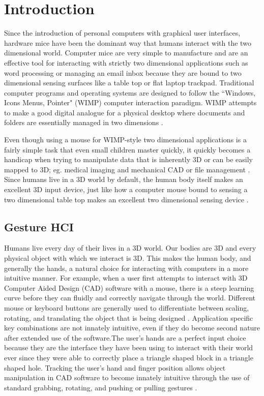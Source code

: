 \chapter{Introduction}

Since the introduction of personal computers with graphical user interfaces, hardware mice have been the dominant way that humans interact with the two dimensional world. Computer mice are very simple to manufacture and are an effective tool for interacting with strictly two dimensional applications such as word processing or managing an email inbox because they are bound to two dimensional sensing surfaces like a table top or flat laptop trackpad. Traditional computer programs and operating systems are designed to follow the ``Windows, Icons Menus, Pointer" (WIMP) computer interaction paradigm. WIMP attempts to make a good digital analogue for a physical desktop where documents and folders are essentially managed in two dimensions \cite{hinckley2002input}.

Even though using a mouse for WIMP-style two dimensional applications is a fairly simple task that even small children master quickly, it quickly becomes a handicap when trying to manipulate data that is inherently 3D or can be easily mapped to 3D; eg. medical imaging and mechanical CAD or file management \cite{krueger1991artificial}. Since humans live in a 3D world by default, the human body itself makes an excellent 3D input device, just like how a computer mouse bound to sensing a two dimensional table top makes an excellent two dimensional sensing device \cite{wren1996pfinder}.

\section{Gesture HCI}

Humans live every day of their lives in a 3D world. Our bodies are 3D and every physical object with which we interact is 3D. This makes the human body, and generally the hands, a natural choice for interacting with computers in a more intuitive manner. For example, when a user first attempts to interact with 3D Computer Aided Design (CAD) software with a mouse, there is a steep learning curve before they can fluidly and correctly navigate through the world. Different mouse or keyboard buttons are generally used to differentiate between scaling, rotating, and translating the object that is being designed \cite{hamade2007evaluating}. Application specific key combinations are not innately intuitive, even if they do become second nature after extended use of the software.The user's hands are a perfect input choice because they are the interface they have been using to interact with their world ever since they were able to correctly place a triangle shaped block in a triangle shaped hole. Tracking the user's hand and finger position allows object manipulation in CAD software to become innately intuitive through the use of standard grabbing, rotating, and pushing or pulling gestures \cite{nam1996recognition}.

